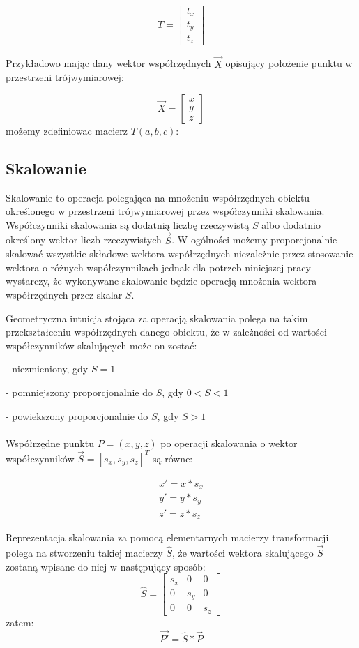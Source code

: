 \documentclass[licencjacka]{pracamgr}
\begin{document}
$$
T=\begin{bmatrix}
t_x \\
t_y \\
t_z
\end{bmatrix}
$$

Przykładowo mając dany wektor współrzędnych $\vec{X}$ opisujący położenie punktu w przestrzeni trójwymiarowej:

$$
\vec{X}=\begin{bmatrix}
x \\
y \\
z
\end{bmatrix}
$$
możemy zdefiniowac macierz $T(a,b,c)$:

\fi

\subsection{Skalowanie}
Skalowanie to operacja polegająca na mnożeniu współrzędnych obiektu określonego w przestrzeni trójwymiarowej przez współczynniki skalowania. Współczynniki skalowania są dodatnią liczbę rzeczywistą $S$ albo dodatnio określony wektor liczb rzeczywistych $\vec{S}$. W ogólności możemy proporcjonalnie skalować wszystkie składowe wektora współrzędnych niezależnie przez stosowanie wektora o różnych współczynnikach jednak dla potrzeb niniejszej pracy wystarczy, że wykonywane skalowanie będzie operacją mnożenia wektora współrzędnych przez skalar $S$.

Geometryczna intuicja stojąca za operacją skalowania polega na takim przekształceniu współrzędnych danego obiektu, że w zależności od wartości współczynników skalujących może on zostać: 

- niezmieniony, gdy $S=1$

- pomniejszony proporcjonalnie do $S$, gdy $0<S<1$

- powiekszony proporcjonalnie do $S$, gdy $S>1$
\\
\\
Współrzędne punktu $P=(x,y,z)$ po operacji skalowania o wektor współczynników $\vec{S}=[s_x,s_y,s_z]^T$ są równe:

$$
\begin{array}{lr}
x'=x*s_x \\
y'=y*s_y \\
z'=z*s_z
\end{array}
$$

Reprezentacja skalowania za pomocą elementarnych macierzy transformacji polega na stworzeniu takiej macierzy $\hat{S}$, że wartości wektora skalującego $\vec{S}$ zostaną wpisane do niej w następujący sposób:
$$
\hat{S}
=
\begin{bmatrix}
s_x & 0 & 0 \\
0 & s_y & 0 \\
0 & 0 & s_z
\end{bmatrix}
$$
zatem:
$$
\vec{P'}=\hat{S}*\vec{P}
$$
\end{document}
